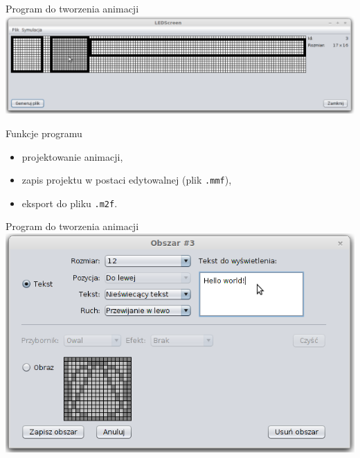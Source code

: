 \documentclass{beamer}
\begin{document}
\begin{frame}{Program do tworzenia animacji}
	\includegraphics[width=\textwidth]{img/gui2.png}
	\begin{block}{Funkcje programu}
		\begin{itemize}
			\item projektowanie animacji,
			\item zapis projektu w postaci edytowalnej (plik \texttt{.mmf}),
			\item eksport do pliku \texttt{.m2f}.
		\end{itemize}
	\end{block}
\end{frame}

\begin{frame}{Program do tworzenia animacji}
	\includegraphics[width=\textwidth]{img/areaText.png}
\end{frame}
\end{document}
